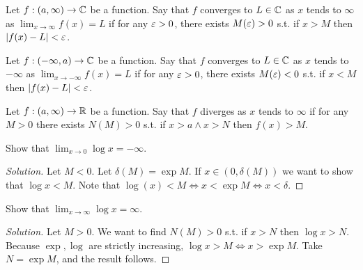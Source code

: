 \begin{definition}
  Let $f:(a,\infty)\to\mathbb C$ be a function. Say that  $f$ converges to $L\in\mathbb C$ as $x$
  tends to $\infty$ as $\lim_{x\to\infty}f(x)=L$ if for any $\varepsilon>0$, there exists
  $M(\varepsilon)>0$ s.t. if $x>M$ then $|f(x)-L|<\varepsilon$.


  Let $f:(-\infty,a)\to\mathbb C$ be a function. Say that  $f$ converges to $L\in\mathbb C$ as $x$
  tends to $-\infty$ as $\lim_{x\to -\infty}f(x)=L$ if for any $\varepsilon>0$, there exists
  $M(\varepsilon)<0$ s.t. if $x<M$ then $|f(x)-L|<\varepsilon$.
  \label{<+label+>}
\end{definition}

\begin{definition}
  Let $f:(a,\infty)\to\mathbb R$ be a function. Say that $f$ diverges as $x$ tends to $\infty$
  if for any $M>0$ there exists $N(M)>0$ s.t. if $x>a\land x>N$ then $f(x)>M$.
  \label{<+label+>}
\end{definition}

\begin{example}
  Show that $\lim_{x\to 0}\log x = -\infty$.
\end{example}
\begin{proof}[Solution]
  Let $M<0$. Let $\delta(M)=\exp M$. If $x\in(0,\delta(M))$ we want to show that $\log x <
  M$. Note that $\log(x)<M \iff x< \exp M \iff x< \delta$.
\end{proof}

\begin{example}
  Show that $\lim_{x\to \infty}\log x = \infty$.
\end{example}
\begin{proof}[Solution]
  Let $M>0$. We want to find $N(M)>0$ s.t. if $x>N$ then $\log x >N$. Because $\exp, \log$
  are strictly increasing, $\log x >M \iff x>\exp M$. Take $N=\exp M$, and the result
  follows.
\end{proof}

